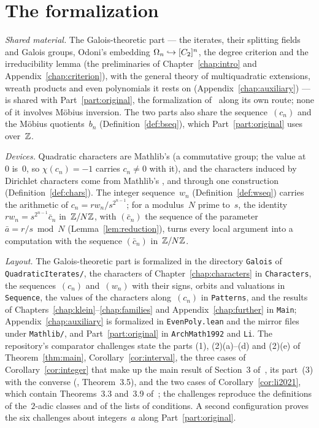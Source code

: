 \section*{The formalization}

\emph{Shared material.} The Galois-theoretic part --- the iterates, their splitting fields and
Galois groups, Odoni's embedding $\Omega_n \hookrightarrow [C_2]^{n}$, the degree criterion and the
irreducibility lemma (the preliminaries of Chapter~\ref{chap:intro} and
Appendix~\ref{chap:criterion}), with the general theory of multiquadratic extensions, wreath
products and even polynomials it rests on (Appendix~\ref{chap:auxiliary}) --- is shared with
Part~\ref{part:original}, the formalization of~\cite{paper} along its own route; none of it
involves Möbius inversion. The two parts also share the sequence~$(c_n)$ and the Möbius
quotients~$b_n$ (Definition~\ref{def:bseq}), which Part~\ref{part:original} uses over~$\mathbb{Z}$.

\emph{Devices.} Quadratic characters are Mathlib's  (a commutative group;
the value at~$0$ is~$0$, so $\chi(c_n) = -1$ carries $c_n \ne 0$ with it), and the characters
induced by Dirichlet characters come from Mathlib's ,
 and  through one construction (Definition~\ref{def:chars}).
The integer sequence~$w_n$ (Definition~\ref{def:wseq}) carries the arithmetic of
$c_n = r w_n/s^{2^{n-1}}$; for a modulus~$N$ prime to~$s$, the identity
$r w_n = s^{2^{n-1}} \bar c_n$ in~$\mathbb{Z}/N\mathbb{Z}$, with $(\bar c_n)$ the sequence of the parameter
$\bar a = r/s \bmod N$ (Lemma~\ref{lem:reduction}), turns every local argument into a
computation with the sequence $(\bar c_n)$ in~$\mathbb{Z}/N\mathbb{Z}$.

\emph{Layout.} The Galois-theoretic part is formalized in the directory \texttt{Galois} of
\texttt{QuadraticIterates/}, the characters of Chapter~\ref{chap:characters} in
\texttt{Characters}, the sequences~$(c_n)$ and~$(w_n)$ with their signs, orbits and valuations in
\texttt{Sequence}, the values of the characters along~$(c_n)$ in \texttt{Patterns}, and the
results of Chapters~\ref{chap:klein}--\ref{chap:families} and Appendix~\ref{chap:further} in
\texttt{Main}; Appendix~\ref{chap:auxiliary} is formalized in \texttt{EvenPoly.lean} and the
mirror files under \texttt{Mathlib/}, and Part~\ref{part:original} in \texttt{ArchMath1992}
and \texttt{Li}. The repository's comparator challenges state the parts
(1), (2)(a)--(d) and (2)(e) of Theorem~\ref{thm:main}, Corollary~\ref{cor:interval}, the three
cases of Corollary~\ref{cor:integer} that make up the main result of Section~3
of~\cite{paper}, its part~(3) with the converse (\cite{li2020}, Theorem~3.5), and the two cases
of Corollary~\ref{cor:li2021}, which contain Theorems~3.3 and~3.9 of~\cite{li2021}; the
challenges reproduce the definitions of the~$2$-adic classes and of the lists of conditions. A
second configuration proves the six challenges about integers~$a$ along
Part~\ref{part:original}.

